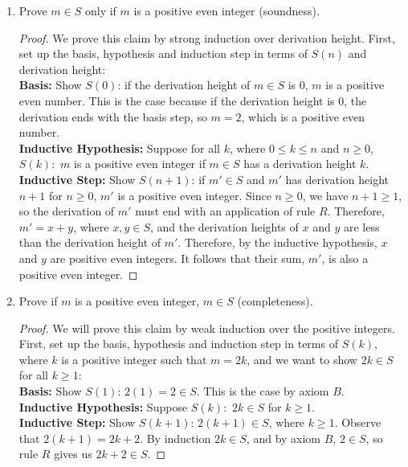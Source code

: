 \documentclass[]{exam}
\begin{document}
\begin{questions}
\begin{enumerate}[label=\alph*)]
\item Prove $m \in S$ only if $m$ is a positive even integer (soundness). 
\begin{solution}
\begin{proof}
We prove this claim by strong induction over derivation height. 
First, set up the basis, hypothesis and induction step in terms of $S(n)$ and
derivation height:
~\\
\textbf{Basis:} Show $S(0)$: if the derivation height of $m \in S$ is $0$, $m$ is a
positive even number. This is the case because if the derivation height is $0$,
the derivation ends with the basis step, so $m = 2$, which is a positive even
number.
~\\
\textbf{Inductive Hypothesis:} Suppose for all $k$, where $0 \leq k \leq n$ and
$n \geq 0$, $S(k):$ $m$ is a positive even integer if $m \in S$ has a derivation
height $k$.
~\\
\textbf{Inductive Step:} Show $S(n+1)$: if $m' \in S$ and $m'$ has derivation
height $n + 1$ for $n \geq 0$, $m'$ is a positive even integer. Since $n \geq 0$,
we have $n + 1 \geq 1$, so the derivation of $m'$ must end with an application of
rule $R$. Therefore, $m' = x + y$, where $x,y \in S$, and the derivation heights
of $x$ and $y$ are less than the derivation height of $m'$. Therefore, by the
inductive hypothesis, $x$ and $y$ are positive even integers. It follows that
their sum, $m'$, is also a positive even integer.
\end{proof}

\end{solution}
\item Prove if $m$ is a positive even integer, $m \in S$ (completeness).
\begin{solution}
\begin{proof}
We will prove this claim by weak induction over the positive integers. 
First, set up the basis, hypothesis and induction step in terms of $S(k)$,
where $k$ is a positive integer such that $m = 2k$, and we want to show
$2k \in S$ for all $k \geq 1$:
~\\
\textbf{Basis:} Show $S(1)$: $2(1) = 2 \in S$. This is the case by axiom $B$.
~\\
\textbf{Inductive Hypothesis:} Suppose $S(k):$ $2k \in S$ for $k \geq 1$.
~\\
\textbf{Inductive Step:} Show $S(k+1)$: $2(k+1) \in S$, where $k \geq 1$.
Observe that $2(k + 1) = 2k + 2$. By induction $2k \in S$, and by axiom
$B$, $2 \in S$, so rule $R$ gives us $2k + 2 \in S$.
\end{proof}


\end{solution}
\end{enumerate}
\end{questions}
\end{document}
